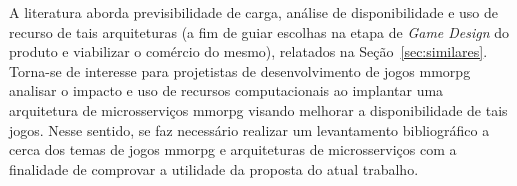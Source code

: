 A literatura aborda previsibilidade de carga, análise de disponibilidade e uso de recurso de tais arquiteturas (a fim de guiar escolhas na etapa de \textit{Game Design} do produto e viabilizar o comércio do mesmo), relatados na Seção~\ref{sec:similares}.
%
Torna-se de interesse para projetistas de desenvolvimento de jogos \ac{mmorpg} analisar o impacto e uso de recursos computacionais ao implantar uma arquitetura de microsserviços \ac{mmorpg} visando melhorar a disponibilidade de tais jogos.
%
Nesse sentido, se faz necessário realizar um levantamento bibliográfico a cerca dos temas de jogos \ac{mmorpg} e arquiteturas de microsserviços com a finalidade de comprovar a utilidade da proposta do atual trabalho.
